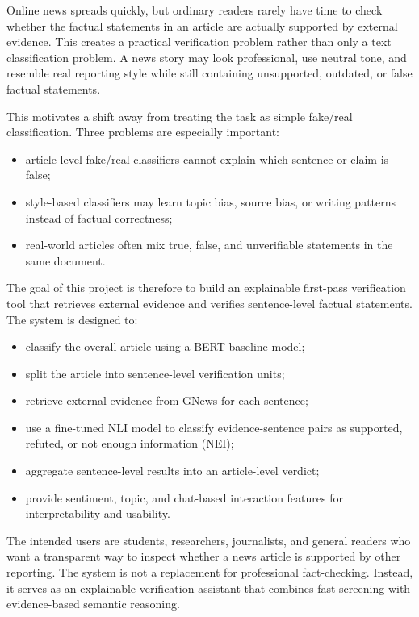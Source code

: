 \documentclass[11pt]{article}
\begin{document}
Online news spreads quickly, but ordinary readers rarely have time to check
whether the factual statements in an article are actually supported by external
evidence. This creates a practical verification problem rather than only a text
classification problem. A news story may look professional, use neutral tone,
and resemble real reporting style while still containing unsupported, outdated,
or false factual statements.

This motivates a shift away from treating the task as simple fake/real
classification. Three problems are especially important:

\begin{itemize}
    \item article-level fake/real classifiers cannot explain which sentence or
    claim is false;
    \item style-based classifiers may learn topic bias, source bias, or writing
    patterns instead of factual correctness;
    \item real-world articles often mix true, false, and unverifiable
    statements in the same document.
\end{itemize}

The goal of this project is therefore to build an explainable first-pass
verification tool that retrieves external evidence and verifies sentence-level
factual statements. The system is designed to:

\begin{itemize}
    \item classify the overall article using a BERT baseline model;
    \item split the article into sentence-level verification units;
    \item retrieve external evidence from GNews for each sentence;
    \item use a fine-tuned NLI model to classify evidence-sentence pairs as
    supported, refuted, or not enough information (NEI);
    \item aggregate sentence-level results into an article-level verdict;
    \item provide sentiment, topic, and chat-based interaction features for
    interpretability and usability.
\end{itemize}

The intended users are students, researchers, journalists, and general readers
who want a transparent way to inspect whether a news article is supported by
other reporting. The system is not a replacement for professional fact-checking.
Instead, it serves as an explainable verification assistant that combines fast
screening with evidence-based semantic reasoning.
\end{document}
